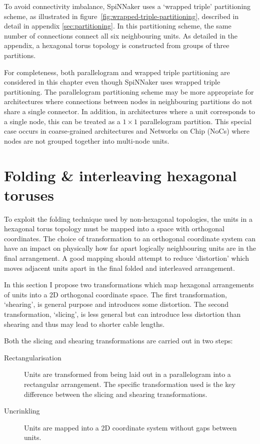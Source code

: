 		To avoid connectivity imbalance, SpiNNaker uses a `wrapped triple'
		partitioning scheme, as illustrated in
		figure~\ref{fig:wrapped-triple-partitioning}, described in detail in
		appendix \ref{sec:partitioning}. In this partitioning scheme, the same
		number of connections connect all six neighbouring units. As detailed in
		the appendix, a hexagonal torus topology is constructed from groups of
		three partitions.
		
		For completeness, both parallelogram and wrapped triple partitioning are
		considered in this chapter even though SpiNNaker uses wrapped triple
		partitioning. The parallelogram partitioning scheme may be more appropriate
		for architectures where connections between nodes in neighbouring
		partitions do not share a single connector. In addition, in architectures
		where a unit corresponds to a single node, this can be treated as a $1
		\times 1$ parallelogram partition.  This special case occurs in
		coarse-grained architectures and Networks on Chip (NoCs) where nodes are
		not grouped together into multi-node units.
	
	\section{Folding \& interleaving hexagonal toruses}
		
		To exploit the folding technique used by non-hexagonal topologies, the
		units in a hexagonal torus topology must be mapped into a space with
		orthogonal coordinates. The choice of transformation to an orthogonal
		coordinate system can have an impact on physically how far apart logically
		neighbouring units are in the final arrangement. A good mapping should
		attempt to reduce `distortion' which moves adjacent units apart in the
		final folded and interleaved arrangement.
		
		In this section I propose two transformations which map hexagonal
		arrangements of units into a 2D orthogonal coordinate space. The first
		transformation, `shearing', is general purpose and introduces some
		distortion. The second transformation, `slicing', is less general but can
		introduce less distortion than shearing and thus may lead to shorter cable
		lengths.
		
		Both the slicing and shearing transformations are carried out in two steps:
		
		\begin{description}
			
			\item[Rectangularisation] Units are transformed from being laid out in a
			parallelogram into a rectangular arrangement. The specific transformation
			used is the key difference between the slicing and shearing
			transformations.
			
			\item[Uncrinkling] Units are mapped into a 2D coordinate system without
			gaps between units.
			
		\end{description}
		
